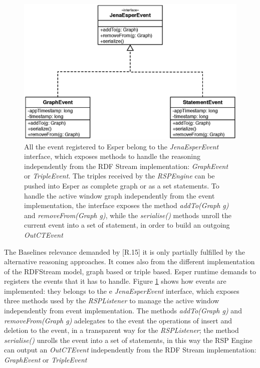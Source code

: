 \begin{figure}[p!]
  \centering
	\includegraphics[width=0.8\linewidth]{images/uml_baselines_events}
	\caption[Esper-level Graph based and Triple based - UML Schema]{ All the event registered to Esper belong to the \textit{JenaEsperEvent} interface, which exposes methods to handle the reasoning independently from the RDF Stream implementation:  \textit{GraphEvent} or \textit{TripleEvent}. The triples received by the \textit{RSPEngine} can be pushed into Esper as complete graph or as a set statements. To handle the active window graph independently from the event implementation, the interface exposes the method \textit{addTo(Graph g)} and \textit{removeFrom(Graph g)}, while the \textit{serialise()} methods unroll the current event into a set of statement, in order to build an outgoing \textit{OutCTEvent}}
  	\label{fig:uml_baselines_events}
\end{figure}

The Baselines relevance demanded by [R.15] it is only partially fulfilled by the alternative reasoning approaches. It comes also from the different implementation of the RDFStream model, graph based or triple based. Esper runtime demands to registers the events that it has to handle. Figure \ref{fig:uml_baselines_events} shows how events are implemented: they belongs to the e \textit{JenaEsperEvent} interface, which exposes three methods used by the \textit{RSPListener} to manage the active window independently from event implementation. The methods \textit{addTo(Graph g)} and \textit{removeFrom(Graph g)} adelegates to the event the operations of insert and deletion to the event, in a transparent way for the \textit{RSPListener}; the method \textit{serialise()} unrolls the event into a set of statements, in this way the RSP Engine can output an \textit{OutCTEvent} independently from the RDF Stream implementation: \textit{GraphEvent} or \textit{TripleEvent}

